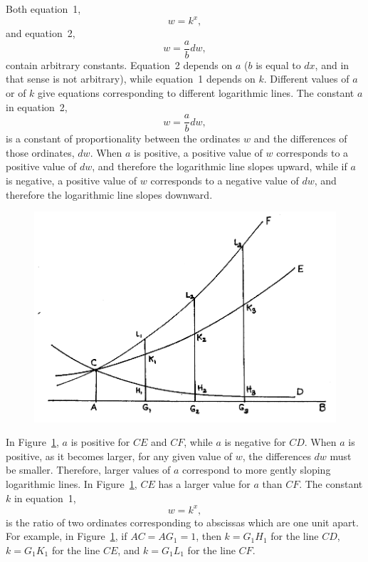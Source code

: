 \documentclass[twoside,openright]{article}
\begin{document}
Both equation~1,\setcounter{equation}{0}
\begin{equation}
w= k^x,
\end{equation}
and equation~2,
\begin{equation}
w = \frac{a}{b}dw,
\end{equation}
contain arbitrary constants.  Equation~2 depends on $a$ ($b$ is equal
to $dx$, and in that sense is not arbitrary), while equation~1 depends
on $k$.  Different values of $a$ or of $k$ give equations
corresponding to different logarithmic lines.  The constant $a$ in
equation~2,
$$w = \frac{a}{b}dw,$$
is a constant of proportionality between the ordinates $w$ and the
differences of those ordinates, $dw$.  When $a$ is positive, a
positive value of $w$ corresponds to a positive value of $dw$, and
therefore the logarithmic line slopes upward, while if $a$ is
negative, a positive value of $w$ corresponds to a negative value of
$dw$, and therefore the logarithmic line slopes downward.
\begin{figure}[htp]
\begin{center}
\includegraphics[width=\textwidth]{fig/Figure27}
\caption{}
\label{logs2}
\vspace{-10pt}
\end{center}
\end{figure} 
In Figure~\ref{logs2}, $a$ is positive for $CE$ and $CF$, while $a$ is
negative for $CD$.  When $a$ is positive, as it becomes larger, for
any given value of $w$, the differences $dw$ must be smaller.
Therefore, larger values of $a$ correspond to more gently sloping
logarithmic lines.  In Figure~\ref{logs2}, $CE$ has a larger value for
$a$ than $CF$.  The constant $k$ in equation~1,
$$w = k^x,$$ 
is the ratio of two ordinates corresponding to abscissas which are one
unit apart.  For example, in Figure~\ref{logs2}, if $AC = AG_1 =1$,
then $k=G_1H_1$ for the line $CD$, $k= G_1K_1$ for the line $CE$, and
$k=G_1L_1$ for the line $CF$.
\end{document}
